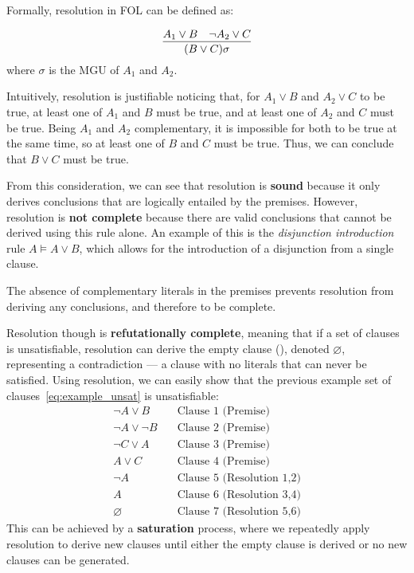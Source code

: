 Formally, resolution in FOL can be defined as:

\begin{equation}
  \infer{(B\lor C)\sigma}{A_1 \lor B & \neg A_2 \lor C}
\end{equation}
\indent where \(\sigma\) is the MGU of \(A_1\) and \(A_2\).

\noindent Intuitively, resolution is justifiable noticing that, for \(A_1 \lor B\) and \(A_2 \lor C\) to be true, at least one of \(A_1\) and \(B\) must be true, and at least one of \(A_2\) and \(C\) must be true.
Being \(A_1\) and \(A_2\) complementary, it is impossible for both to be true at the same time, so at least one of \(B\) and \(C\) must be true. Thus, we can conclude that \(B \lor C\) must be true.

From this consideration, we can see that resolution is \textbf{sound} because it only derives conclusions that are logically entailed by the premises.
However, resolution is \textbf{not complete} because there are valid conclusions that cannot be derived using this rule alone.
An example of this is the \textit{disjunction introduction} rule \(A \models A \lor B\), which allows for the introduction of a disjunction from a single clause.

The absence of complementary literals in the premises prevents resolution from deriving any conclusions, and therefore to be complete.

Resolution though is \textbf{refutationally complete}, meaning that if a set of clauses is unsatisfiable, resolution can derive the empty clause (\citeauthor{robinson1965}\cite{robinson1965}), denoted \(\varnothing\), representing a contradiction --- a clause with no literals that can never be satisfied.
Using resolution, we can easily show that the previous example set of clauses~\ref{eq:example_unsat} is unsatisfiable:
\begin{equation}
  \begin{aligned}
    \neg A \lor B &\quad \text{Clause 1 (Premise)} \\
    \neg A \lor \neg B &\quad \text{Clause 2 (Premise)} \\
    \neg C \lor A &\quad \text{Clause 3 (Premise)} \\
    A \lor C &\quad \text{Clause 4 (Premise)} \\
    \neg A &\quad \text{Clause 5 (Resolution 1,2)} \\
    A &\quad \text{Clause 6 (Resolution 3,4)} \\
    \varnothing &\quad \text{Clause 7 (Resolution 5,6)}
  \end{aligned}
\end{equation}
This can be achieved by a \textbf{saturation} process, where we repeatedly apply resolution to derive new clauses until either the empty clause is derived or no new clauses can be generated.

